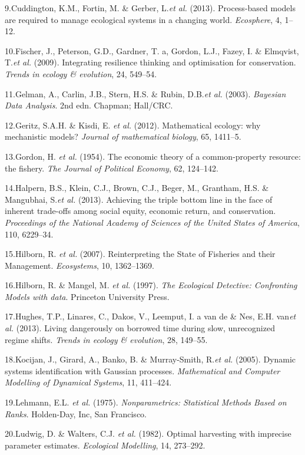\documentclass[author-year, 12pt,review]{elsarticle} %
\begin{document}
9.Cuddington, K.M., Fortin, M. \& Gerber, L.\emph{et al.} (2013).
Process-based models are required to manage ecological systems in a
changing world. \emph{Ecosphere}, 4, 1--12.

10.Fischer, J., Peterson, G.D., Gardner, T. a, Gordon, L.J., Fazey, I.
\& Elmqvist, T.\emph{et al.} (2009). Integrating resilience thinking and
optimisation for conservation. \emph{Trends in ecology \& evolution},
24, 549--54.

11.Gelman, A., Carlin, J.B., Stern, H.S. \& Rubin, D.B.\emph{et al.}
(2003). \emph{Bayesian Data Analysis}. 2nd edn. Chapman; Hall/CRC.

12.Geritz, S.A.H. \& Kisdi, E. \emph{et al.} (2012). Mathematical
ecology: why mechanistic models? \emph{Journal of mathematical biology},
65, 1411--5.

13.Gordon, H. \emph{et al.} (1954). The economic theory of a
common-property resource: the fishery. \emph{The Journal of Political
Economy}, 62, 124--142.

14.Halpern, B.S., Klein, C.J., Brown, C.J., Beger, M., Grantham, H.S. \&
Mangubhai, S.\emph{et al.} (2013). Achieving the triple bottom line in
the face of inherent trade-offs among social equity, economic return,
and conservation. \emph{Proceedings of the National Academy of Sciences
of the United States of America}, 110, 6229--34.

15.Hilborn, R. \emph{et al.} (2007). Reinterpreting the State of
Fisheries and their Management. \emph{Ecosystems}, 10, 1362--1369.

16.Hilborn, R. \& Mangel, M. \emph{et al.} (1997). \emph{The Ecological
Detective: Confronting Models with data}. Princeton University Press.

17.Hughes, T.P., Linares, C., Dakos, V., Leemput, I. a van de \& Nes,
E.H. van\emph{et al.} (2013). Living dangerously on borrowed time during
slow, unrecognized regime shifts. \emph{Trends in ecology \& evolution},
28, 149--55.

18.Kocijan, J., Girard, A., Banko, B. \& Murray-Smith, R.\emph{et al.}
(2005). Dynamic systems identification with Gaussian processes.
\emph{Mathematical and Computer Modelling of Dynamical Systems}, 11,
411--424.

19.Lehmann, E.L. \emph{et al.} (1975). \emph{Nonparametrics: Statistical
Methods Based on Ranks}. Holden-Day, Inc, San Francisco.

20.Ludwig, D. \& Walters, C.J. \emph{et al.} (1982). Optimal harvesting
with imprecise parameter estimates. \emph{Ecological Modelling}, 14,
273--292.
\end{document}
